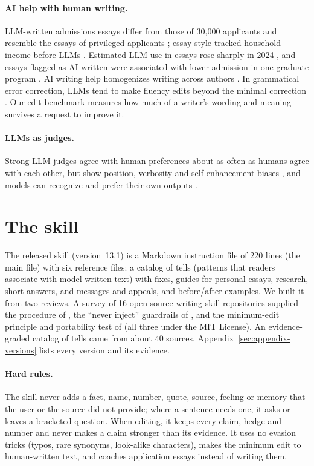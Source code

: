 \documentclass[11pt]{article}
\newcommand{\shipver}{13.1}
\begin{document}
\paragraph{AI help with human writing.} LLM-written admissions essays differ from those of 30,000 applicants and resemble the essays of privileged applicants \citep{lee2025poor,alvero2024hegemony}; essay style tracked household income before LLMs \citep{alvero2021essay}. Estimated LLM use in essays rose sharply in 2024 \citep{lee2026divide}, and essays flagged as AI-written were associated with lower admission in one graduate program \citep{isley2026admissions}. AI writing help homogenizes writing across authors \citep{padmakumar2024diversity,doshi2024creativity,agarwal2025homogenize}. In grammatical error correction, LLMs tend to make fluency edits beyond the minimal correction \citep{fang2023chatgptgec}. Our edit benchmark measures how much of a writer's wording and meaning survives a request to improve it.

\paragraph{LLMs as judges.} Strong LLM judges agree with human preferences about as often as humans agree with each other, but show position, verbosity and self-enhancement biases \citep{zheng2023judging,wang2024fair}, and models can recognize and prefer their own outputs \citep{panickssery2024llm}.

\section{The skill}
\label{sec:skill}

The released skill (version~\shipver{}) is a Markdown instruction file of 220 lines (the main file) with six reference files: a catalog of tells (patterns that readers associate with model-written text) with fixes, guides for personal essays, research, short answers, and messages and appeals, and before/after examples. We built it from two reviews. A survey of 16 open-source writing-skill repositories supplied the procedure of \citet{chen2026humanizer}, the ``never inject'' guardrails of \citet{bronsdon2026avoid}, and the minimum-edit principle and portability test of \citet{yang2026noaislop} (all three under the MIT License). An evidence-graded catalog of tells came from about 40 sources. Appendix~\ref{sec:appendix-versions} lists every version and its evidence.

\paragraph{Hard rules.} The skill never adds a fact, name, number, quote, source, feeling or memory that the user or the source did not provide; where a sentence needs one, it asks or leaves a bracketed question. When editing, it keeps every claim, hedge and number and never makes a claim stronger than its evidence. It uses no evasion tricks (typos, rare synonyms, look-alike characters), makes the minimum edit to human-written text, and coaches application essays instead of writing them.
\end{document}
